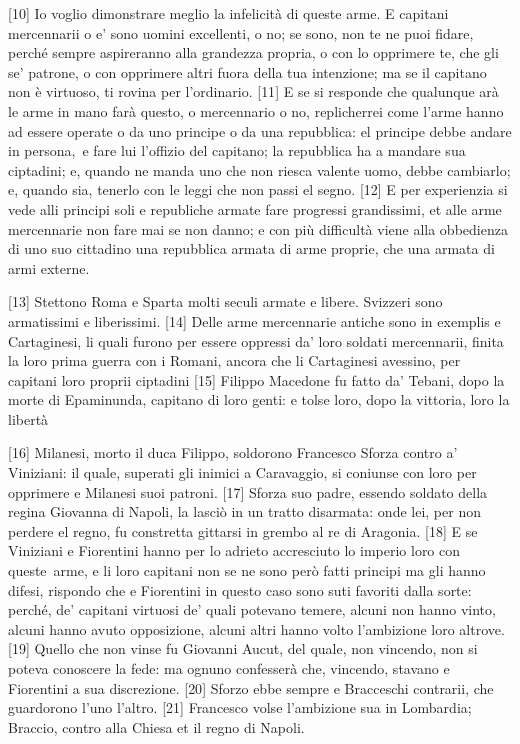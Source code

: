 {[}10{]} Io voglio dimonstrare meglio la infelicità di queste arme. E
capitani mercennarii o e' sono uomini excellenti, o no; se sono, non te
ne puoi fidare, perché sempre aspireranno alla grandezza propria, o con
lo opprimere te, che gli se' patrone, o con opprimere altri fuora della
tua intenzione; ma se il capitano non è virtuoso, ti rovina per
l'ordinario. {[}11{]} E se si responde che qualunque arà le arme in mano
farà questo, o mercennario o no, replicherrei come l'arme hanno ad
essere operate o da uno principe o da una repubblica: el principe debbe
andare in persona,\est\ e fare lui l'offizio del capitano; la repubblica ha a
mandare sua ciptadini; e, quando ne manda uno che non riesca valente
uomo, debbe cambiarlo; e, quando sia, tenerlo con le leggi che non passi
el segno. {[}12{]} E per experienzia si vede alli principi soli e
republiche armate fare progressi grandissimi, et alle arme mercennarie
non fare mai se non danno; e con più difficultà viene alla obbedienza di
uno suo cittadino una repubblica armata di arme proprie, che una armata
di armi externe.

{[}13{]} Stettono Roma e Sparta molti seculi armate e libere. Svizzeri
sono armatissimi e liberissimi. {[}14{]} Delle arme mercennarie antiche
sono in exemplis e Cartaginesi, li quali furono per essere oppressi da'
loro soldati mercennarii, finita la loro prima guerra con i Romani,
ancora che li Cartaginesi avessino, per capitani loro proprii ciptadini
{[}15{]} Filippo Macedone fu fatto da' Tebani, dopo la morte di
Epaminunda, capitano di loro genti: e tolse loro, dopo la vittoria, loro
la libertà

{[}16{]} Milanesi, morto il duca Filippo, soldorono Francesco Sforza
contro a' Viniziani: il quale, superati gli inimici a Caravaggio, si
coniunse con loro per opprimere e Milanesi suoi patroni. {[}17{]} Sforza
suo padre, essendo soldato della regina Giovanna di Napoli, la lasciò in
un tratto disarmata: onde lei, per non perdere el regno, fu constretta
gittarsi in grembo al re di Aragonia. {[}18{]} E se Viniziani e
Fiorentini hanno per lo adrieto accresciuto lo imperio loro con queste\est\
arme, e li loro capitani non se ne sono però fatti principi ma gli hanno
difesi, rispondo che e Fiorentini in questo caso sono suti favoriti
dalla sorte: perché, de' capitani virtuosi de' quali potevano temere,
alcuni non hanno vinto, alcuni hanno avuto opposizione, alcuni altri
hanno volto l'ambizione loro altrove.
{[}19{]} Quello che non vinse fu Giovanni Aucut, del quale, non
vincendo, non si poteva conoscere la fede: ma ognuno confesserà che,
vincendo, stavano e Fiorentini a sua discrezione. {[}20{]} Sforzo ebbe
sempre e Bracceschi contrarii, che guardorono l'uno l'altro. {[}21{]}
Francesco volse l'ambizione sua in Lombardia; Braccio, contro alla
Chiesa et il regno di Napoli.

